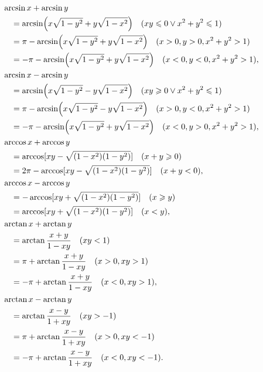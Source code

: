 \begin{theorem}[和差公式]
\begin{align}
&\hspace{-10pt}
\arcsin x + \arcsin y \\
	&= \arcsin(x \sqrt{1-y^2} + y \sqrt{1-x^2})
		\quad(xy\leqslant0 \lor x^2+y^2\leqslant1) \\
	&= \pi - \arcsin(x \sqrt{1-y^2} + y \sqrt{1-x^2})
		\quad(x>0, y>0, x^2+y^2>1) \\
	&= -\pi - \arcsin(x \sqrt{1-y^2} + y \sqrt{1-x^2})
		\quad(x<0, y<0, x^2+y^2>1), \\
&\hspace{-10pt}
\arcsin x - \arcsin y \\
	&= \arcsin(x \sqrt{1-y^2} - y \sqrt{1-x^2})
		\quad(xy\geqslant0 \lor x^2+y^2\leqslant1) \\
	&= \pi - \arcsin(x \sqrt{1-y^2} - y \sqrt{1-x^2})
		\quad(x>0, y<0, x^2+y^2>1) \\
	&= -\pi - \arcsin(x \sqrt{1-y^2} + y \sqrt{1-x^2})
		\quad(x<0, y>0, x^2+y^2>1), \\
&\hspace{-10pt}
\arccos x + \arccos y \\
	&= \arccos[xy - \sqrt{(1-x^2)(1-y^2)}]
		\quad(x+y\geqslant0) \\
	&= 2\pi - \arccos[xy - \sqrt{(1-x^2)(1-y^2)}]
		\quad(x+y<0), \\
&\hspace{-10pt}
\arccos x - \arccos y \\
	&= -\arccos[xy + \sqrt{(1-x^2)(1-y^2)}]
		\quad(x \geqslant y) \\
	&= \arccos[xy + \sqrt{(1-x^2)(1-y^2)}]
		\quad(x<y), \\
&\hspace{-10pt}
\arctan x + \arctan y \\
	&= \arctan\frac{x+y}{1-xy}
		\quad(xy<1) \\
	&= \pi+\arctan\frac{x+y}{1-xy}
		\quad(x>0,xy>1) \\
	&= -\pi+\arctan\frac{x+y}{1-xy}
		\quad(x<0,xy>1), \\
&\hspace{-10pt}
\arctan x - \arctan y \\
	&= \arctan\frac{x-y}{1+xy}
		\quad(xy>-1) \\
	&= \pi+\arctan\frac{x-y}{1+xy}
		\quad(x>0,xy<-1) \\
	&= -\pi+\arctan\frac{x-y}{1+xy}
		\quad(x<0,xy<-1).
\end{align}
\end{theorem}

